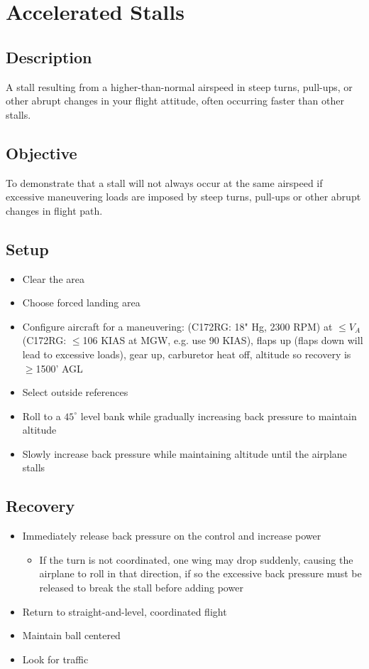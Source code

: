 \section{Accelerated Stalls}

\subsection{Description}

A stall resulting from a higher-than-normal airspeed in steep turns, pull-ups,
or other abrupt changes in your flight attitude, often occurring faster than
other stalls.

\subsection{Objective}

To demonstrate that a stall will not always occur at the same airspeed if
excessive maneuvering loads are imposed by steep turns, pull-ups or other
abrupt changes in flight path.

\subsection{Setup}

\begin{itemize}
  \item Clear the area
  \item Choose forced landing area
  \item Configure aircraft for a maneuvering: (C172RG: 18" Hg, 2300 RPM) at
    $\leq{}V_{A}$ (C172RG: $\leq$106 KIAS at MGW, e.g. use 90 KIAS), flaps up
    (flaps down will lead to excessive loads), gear up, carburetor heat off,
    altitude so recovery is $\geq$1500' AGL
  \item Select outside references
  \item Roll to a $45^{\circ}$ level bank while gradually increasing back
    pressure to maintain altitude
  \item Slowly increase back pressure while maintaining altitude until the
    airplane stalls
\end{itemize}

\subsection{Recovery}

\begin{itemize}
  \item Immediately release back pressure on the control and increase power
    \begin{itemize}
      \item If the turn is not coordinated, one wing may drop suddenly, causing
        the airplane to roll in that direction, if so the excessive back
        pressure must be released to break the stall before adding power
    \end{itemize}
  \item Return to straight-and-level, coordinated flight
  \item Maintain ball centered
  \item Look for traffic
\end{itemize}

